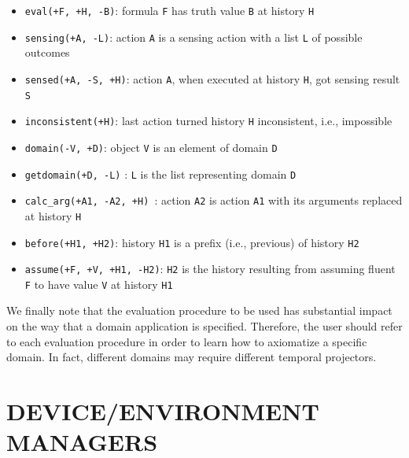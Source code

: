 \documentclass[11pt]{article}
\begin{document}
\begin{itemize}
\item \texttt{eval(+F, +H, -B)}:
  formula \texttt{F} has truth value \texttt{B} at history \texttt{H}
  
\item \texttt{sensing(+A, -L)}:
  action \texttt{A} is a sensing action with a list \texttt{L} of possible
outcomes 

\item \texttt{sensed(+A, -S, +H)}:
  action \texttt{A}, when executed at history \texttt{H}, got sensing result
  \texttt{S}
  
\item \texttt{inconsistent(+H)}:
  last action turned history \texttt{H} inconsistent, i.e., impossible 
  
\item \texttt{domain(-V, +D)}:
  object \texttt{V} is an element of domain \texttt{D}
  
\item \texttt{getdomain(+D, -L)}   :
  \texttt{L} is the list representing domain \texttt{D}
  
\item \texttt{calc\_arg(+A1, -A2, +H) }:
  action \texttt{A2} is action \texttt{A1} with its arguments replaced at
history \texttt{H}

\item \texttt{before(+H1, +H2)}:
  history \texttt{H1} is a prefix (i.e., previous) of history \texttt{H2}
  
\item \texttt{assume(+F, +V, +H1, -H2)}:
  \texttt{H2} is the history resulting from assuming fluent \texttt{F} 
  to have value \texttt{V} at history \texttt{H1}
\end{itemize}

We finally note that the evaluation procedure to be used has
substantial impact on the way that a domain application is specified.
Therefore, the user should refer to each evaluation procedure in order to learn
how to axiomatize a specific domain. In fact, different domains may require
different temporal projectors.



\section{DEVICE/ENVIRONMENT MANAGERS \label{sec:environments}}
\end{document}
